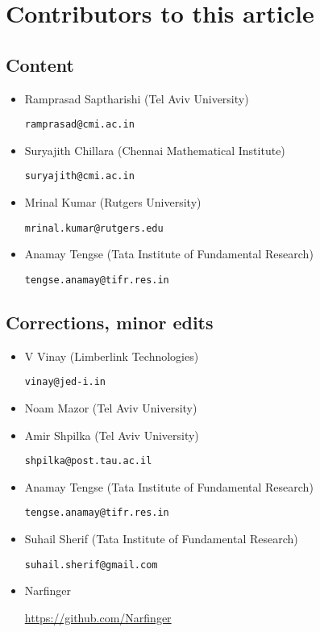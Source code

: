 \chapter*{Contributors to this article}

\section*{Content}

\begin{itemize}
\item Ramprasad Saptharishi (Tel Aviv University)

\texttt{ramprasad@cmi.ac.in}

\item Suryajith Chillara (Chennai Mathematical Institute)

\texttt{suryajith@cmi.ac.in}

\item Mrinal Kumar (Rutgers University)

\texttt{mrinal.kumar@rutgers.edu}

\item Anamay Tengse (Tata Institute of Fundamental Research)

\texttt{tengse.anamay@tifr.res.in}


\end{itemize}

\section*{Corrections, minor edits}

\begin{itemize}
\item V Vinay (Limberlink Technologies)

\texttt{vinay@jed-i.in}

\item Noam Mazor (Tel Aviv University)

\item Amir Shpilka (Tel Aviv University)

\texttt{shpilka@post.tau.ac.il}

\item Anamay Tengse (Tata Institute of Fundamental Research)

\texttt{tengse.anamay@tifr.res.in}

\item Suhail Sherif (Tata Institute of Fundamental Research)

\texttt{suhail.sherif@gmail.com}

\item Narfinger

  \url{https://github.com/Narfinger}


\end{itemize}


